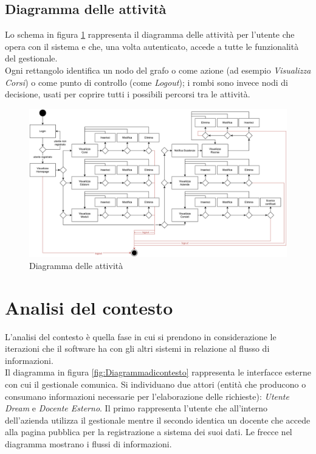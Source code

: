 \subsection{Diagramma delle attività}
Lo schema in figura \ref{fig:Diagrammadelleattivita} rappresenta il diagramma delle attività per l'utente che opera con il sistema e che, una volta autenticato, accede a tutte le funzionalità del gestionale.\\
Ogni rettangolo identifica un nodo del grafo o come azione (ad esempio \textit{Visualizza Corsi}) o come punto di controllo (come \textit{Logout}); i rombi sono invece nodi di decisione, usati per coprire tutti i possibili percorsi tra le attività.
\begin{figure}[h]
\centering
\includegraphics[scale=0.55]{img/Diagramma delle attivita.jpg}
\caption{Diagramma delle attività}
\label{fig:Diagrammadelleattivita}
\end{figure}
\noindent




\section{Analisi del contesto}
\label{sec:contesto}
L'analisi del contesto è quella fase in cui si prendono in considerazione le iterazioni che il software ha con gli altri sistemi in relazione al flusso di informazioni.\\
\newline
Il diagramma in figura \ref{fig:Diagrammadicontesto} rappresenta le interfacce esterne con cui il gestionale comunica. Si individuano due attori (entità che producono o consumano informazioni necessarie per l’elaborazione delle richieste): \textit{Utente Dream} e \textit{Docente Esterno}. Il primo rappresenta l'utente che all'interno dell'azienda utilizza il gestionale mentre il secondo identica un docente che accede alla pagina pubblica per la registrazione a sistema dei suoi dati. Le frecce nel diagramma mostrano i flussi di informazioni.
